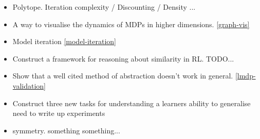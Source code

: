\begin{itemize}
  \tightlist
  \item Polytope. Iteration complexity / Discounting / Density ...
  \item A way to visualise the dynamics of MDPs in higher dimensions. \ref{graph-vis}
  \item Model iteration \ref{model-iteration}
  \item Construct a framework for reasoning about similarity in RL. {\color{red}TODO...}
  \item Show that a well cited method of abstraction doesn't work in general. \ref{lmdp-validation}
  \item Construct three new tasks for understanding a learners ability to generalise {\color{red}need to write up experiments}
  \item symmetry. something something...
\end{itemize}
